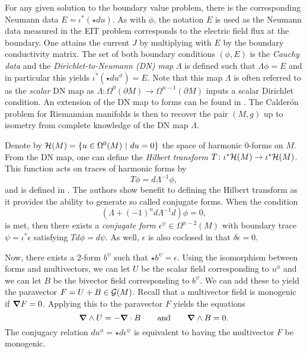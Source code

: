 \documentclass[12pt]{article}
\begin{document}
For any given solution to the boundary value problem, there is the corresponding Neumann data $E=\iota^*(\star d u)$.  As with $\phi$, the notation $E$ is used as the Neumann data measured in the EIT problem corresponds to the electric field flux at the boundary. One attains the current $J$ by multiplying with $E$ by the boundary conductivity matrix. The set of both boundary conditions $(\phi, E)$ is the \emph{Cauchy data} and the \emph{Dirichlet-to-Neumann (DN) map} $\Lambda$ is defined such that $\Lambda \phi = E$ and in particular this yields $\iota^*(\star d u^\phi)= E$. Note that this map $\Lambda$ is often referred to as the \emph{scalar} DN map as $\Lambda \colon \Omega^0(\partial M) \to \Omega^{n-1}(\partial M)$ inputs a scalar Dirichlet condition. An extension of the DN map to forms can be found in \cite{belishev_dirichlet_2008,sharafutdinov_complete_2013}. The Calder\'on problem for Riemannian manifolds is then to recover the pair $(M,g)$ up to isometry from complete knowledge of the DN map $\Lambda$. 

Denote by $\mathcal{H}(M) = \{u \in \Omega^0(M) ~\vert~ du=0\}$ the space of harmonic 0-forms on $M$.  From the DN map, one can define the \emph{Hilbert transform} $T\colon \iota^* \mathcal{H}(M) \to \iota^* \mathcal{H}(M)$.  This function acts on traces of harmonic forms by
\[
T \phi  = d\Lambda^{-1} \phi,
\]
and is defined in \cite{belishev_dirichlet_2008}. The authors show benefit to defining the Hilbert transform as it provides the ability to generate so called conjugate forms.  When the condition
\begin{equation}
\label{eq:conjugate_requirement}
\left( \Lambda + (-1)^{n}d\Lambda^{-1}d\right)\phi = 0, 
\end{equation}
is met, then there exists a \emph{conjugate form} $\epsilon^\psi \in \Omega^{n-2}(M)$ with boundary trace $\psi = \iota^* \epsilon$ satisfying $Td\phi = d \psi$. As well, $\epsilon$ is also coclosed in that $\delta \epsilon=0$. 

Now, there exists a 2-form $b^\psi$ such that $\star b^\psi = \epsilon$.  Using the isomorphism between forms and multivectors, we can let $U$ be the scalar field corresponding to $u^\phi$ and we can let $B$ be the bivector field corresponding to $b^\psi$.  We can add these to yield the paravector $F=U+B \in \mathcal{G}(M)$.   Recall that a multivector field is monogenic if $\boldsymbol{\nabla} F=0$.  Applying this to the paravector $F$ yields the equations
\[
\boldsymbol{\nabla} \wedge U = -\boldsymbol{\nabla} \cdot B \qquad \textrm{and} \qquad \boldsymbol{\nabla} \wedge B = 0.
\]
The conjugacy relation $du^\phi = \star d \epsilon^\psi$ is equivalent to having the multivector $F$ be monogenic.
\end{document}
